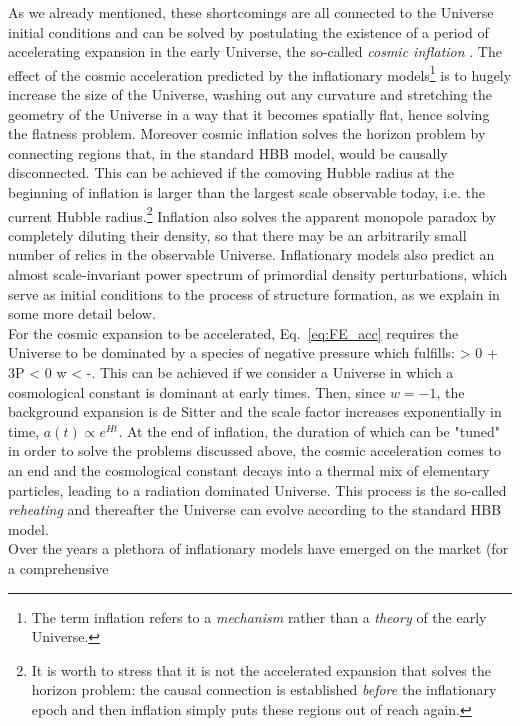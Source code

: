 As we already mentioned, these shortcomings are all connected to the Universe initial conditions and
can be solved by postulating the existence of a period of accelerating expansion in the early Universe,
the so-called \emph{cosmic inflation} \citep{Guth1981,Starobinsky1982,Linde1982}. 
The effect of the cosmic acceleration predicted by the inflationary models\footnote{The term inflation refers to a \emph{mechanism} rather than a \emph{theory} of the early Universe.} is to hugely increase 
the size of the Universe, washing out any curvature and stretching the geometry of the Universe in a way
that it becomes spatially flat, hence solving the flatness problem. Moreover cosmic inflation solves the 
horizon problem by connecting regions that, in the standard HBB model, would be causally disconnected.
This can be achieved if the comoving Hubble radius at the beginning of inflation is larger than the largest
scale observable today, i.e. the current Hubble radius.\footnote{It is worth to stress that it is not the 
accelerated expansion that solves the horizon problem: the causal connection is established 
\emph{before} the inflationary epoch and then inflation simply puts these regions out of reach again.}
Inflation also solves the apparent monopole paradox by completely diluting their density, so that
there may be an arbitrarily small number of relics in the observable Universe. Inflationary models also 
predict an almost scale-invariant power spectrum of primordial density perturbations, which serve as
initial conditions to the process of structure formation, as we explain in some more detail below. \\
For the cosmic expansion to be accelerated, Eq.~\eqref{eq:FE_acc} requires the Universe to be dominated 
by a species of negative pressure which fulfills:
%
\be
{} > 0 \Leftrightarrow \rho + 3P < 0 \Leftrightarrow w < -.
\ee
%
This can be achieved if we consider a Universe in which a cosmological constant is dominant at early 
times. Then, since $w = -1$, the background expansion is de Sitter and the scale factor increases 
exponentially in time, $a(t) \propto e^{Ht}$. At the end of inflation, the duration of which can be "tuned" in order
to solve the problems discussed above, the cosmic acceleration comes to an end and the cosmological 
constant decays into a thermal mix of elementary particles, leading to a radiation dominated Universe.
This process is the so-called \emph{reheating} and thereafter the Universe can evolve according to the 
standard HBB model.\\
Over the years a plethora of inflationary models have emerged on the market (for a comprehensive 
